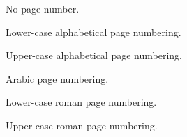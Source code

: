 \documentclass[11pt, english]{article}
\begin{document}
\newpage


	No page number.

\newpage


	Lower-case alphabetical page numbering.

\newpage 


	Upper-case alphabetical page numbering.

\newpage 


	Arabic page numbering.

\newpage


	Lower-case roman page numbering.

\newpage


	Upper-case roman page numbering.
\end{document}
